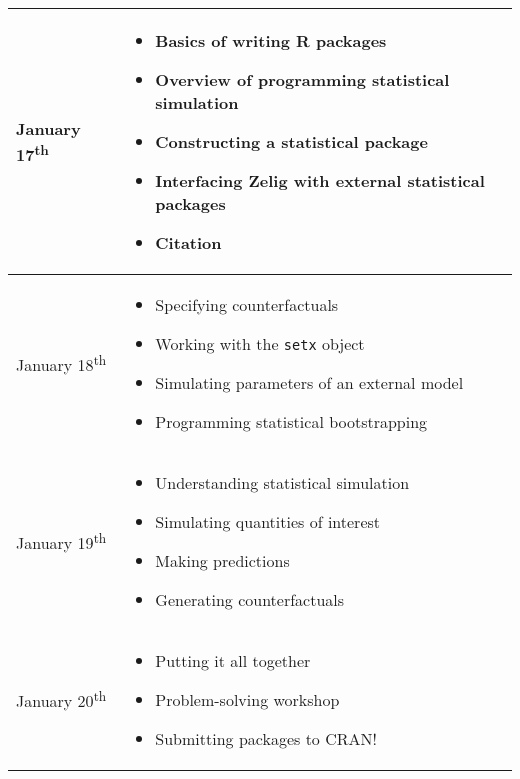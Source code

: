 \documentclass{article}
\begin{document}
\begin{tabular}{ | p{} | p{} |}

  \hline

  January 17\textsuperscript{th} & 
  \begin{itemize}
    \item Basics of writing R packages
    \item Overview of programming statistical simulation
    \item Constructing a statistical package
    \item Interfacing Zelig with external statistical packages
    \item Citation
  \end{itemize}
  \\ \hline

  January 18\textsuperscript{th} & 
  \begin{itemize}
    \item Specifying counterfactuals 
    \item Working with the {\tt setx} object
    \item Simulating parameters of an external model
    \item Programming statistical bootstrapping
  \end{itemize}
  \\ \hline

  January 19\textsuperscript{th} & 
  \begin{itemize}
    \item Understanding statistical simulation
    \item Simulating quantities of interest
    \item Making predictions
    \item Generating counterfactuals
  \end{itemize}
  \\ \hline

  January 20\textsuperscript{th} & 
  \begin{itemize}
    \item Putting it all together
    \item Problem-solving workshop
    \item Submitting packages to CRAN!
  \end{itemize}
  \\ \hline

\end{tabular}
\end{document}
